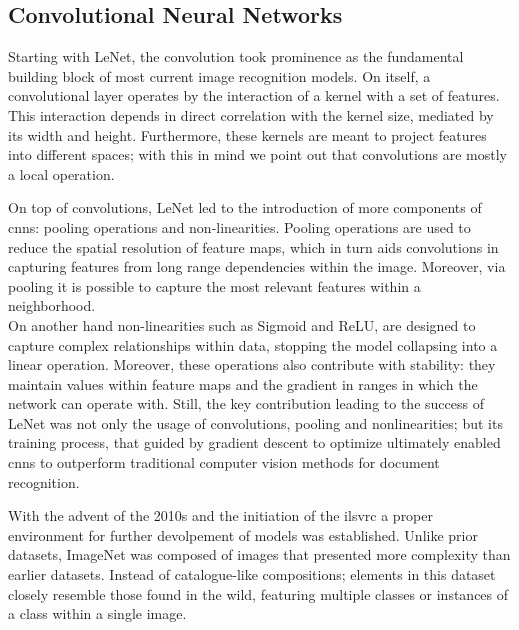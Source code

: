 \subsection{Convolutional Neural Networks}
\label{rel:sub_cnn}
Starting with LeNet, the convolution took prominence as the fundamental building block 
of most current image recognition models. On itself, a convolutional layer operates by the 
interaction of a kernel with a set of features. This interaction depends in 
direct correlation with the kernel size, mediated by its width and height. Furthermore, 
these kernels are meant to project features into different spaces; with this in mind we point out 
that convolutions are mostly a local operation. 
%

\noindent On top of convolutions, LeNet led to the introduction of more components of \glspl{cnn}: 
pooling operations and non-linearities. Pooling operations are used to reduce the spatial 
resolution of feature maps, which in turn aids convolutions in capturing features from long 
range dependencies within the image. Moreover, via pooling it is possible to capture the most 
relevant features within a neighborhood.\\
On another hand non-linearities such as Sigmoid and ReLU, are designed to capture complex 
relationships within data, stopping the model collapsing into a linear operation. Moreover, these 
operations also contribute with stability: they maintain values within feature maps and the gradient 
in ranges in which the network can operate with. %
Still, the key contribution leading to the success of LeNet was not only the usage of 
convolutions, pooling and nonlinearities; but its training process, that guided by gradient descent 
to optimize ultimately enabled \glspl{cnn} to outperform traditional computer vision methods for 
document recognition. 



\noindent With the advent of the 2010s and the initiation of the \gls{ilsvrc} \autocite{ILSVRC15} 
a proper environment for further devolpement of models was established. Unlike prior datasets, 
ImageNet was composed of images that presented more complexity than earlier datasets. Instead 
of catalogue-like compositions; elements in this dataset closely resemble those found 
in the wild, featuring multiple classes or instances of a class within a single image.

